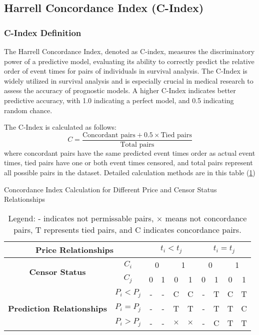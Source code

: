 \subsection{Harrell Concordance Index (C-Index)}
\subsubsection{C-Index Definition}
The Harrell Concordance Index, denoted as C-index, measures the discriminatory power of a predictive model, evaluating its ability to correctly predict the relative order of event times for pairs of individuals in survival analysis. The C-Index is widely utilized in survival analysis and is especially crucial in medical research to assess the accuracy of prognostic models. A higher C-Index indicates better predictive accuracy, with 1.0 indicating a perfect model, and 0.5 indicating random chance.

The C-Index is calculated as follows:
\[
C = \frac{\text{Concordant pairs} + 0.5 \times \text{Tied pairs}}{\text{Total pairs}}
\]
where concordant pairs have the same predicted event times order as actual event times, tied pairs have one or both event times censored, and total pairs represent all possible pairs in the dataset. Detailed calculation methods are in this table (\ref{tab:concordance-index})

\begin{table}[H]
    \caption{Concordance Index Calculation for Different Price and Censor Status Relationships}
    \label{tab:concordance-index}
    \centering
    \begin{tabular}{|c|c|c|c|c|c|c|c|c|c|}
        \hline
        \multicolumn{2}{|c|}{\textbf{Price Relationships}} & \multicolumn{4}{c|}{$t_i<t_j$} & \multicolumn{4}{c|}{$t_i=t_j$}\\ \hline
        \multirow{2}{*}{\textbf{Censor Status}}&$C_i$ & \multicolumn{2}{c|}{0} & \multicolumn{2}{c|}{1} & \multicolumn{2}{c|}{0} & \multicolumn{2}{c|}{1} \\ \cline{2-10}
        ~&$C_j$ & 0 & 1 & 0 & 1 & 0 & 1 & 0 & 1 \\ \hline
        \multirow{3}{*}{\textbf{Prediction Relationships}}&$P_i<P_j$ & - & - & C & C & - & T & C & T \\ \cline{2-10}
        ~&$P_i=P_j$ & - & - & T & T & - & T & T & C \\ \cline{2-10}
        ~&$P_i>P_j$ & - & - & $\times$ & $\times$ & - & C & T & T \\ \hline
    \end{tabular}
    \vspace{0.5em} %
    \caption*{Legend: - indicates not permissable pairs, $\times$ means not concordance pairs, T represents tied pairs, and C indicates concordance pairs.}
\end{table}


